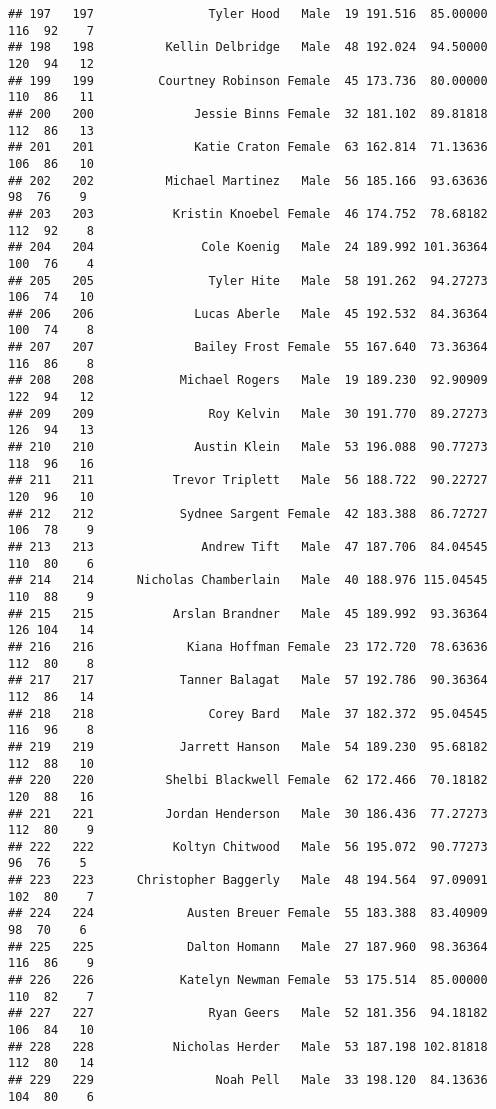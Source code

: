 \documentclass[
]{article}
\begin{document}
\begin{verbatim}
## 197   197                Tyler Hood   Male  19 191.516  85.00000 116  92    7
## 198   198          Kellin Delbridge   Male  48 192.024  94.50000 120  94   12
## 199   199         Courtney Robinson Female  45 173.736  80.00000 110  86   11
## 200   200              Jessie Binns Female  32 181.102  89.81818 112  86   13
## 201   201              Katie Craton Female  63 162.814  71.13636 106  86   10
## 202   202          Michael Martinez   Male  56 185.166  93.63636  98  76    9
## 203   203           Kristin Knoebel Female  46 174.752  78.68182 112  92    8
## 204   204               Cole Koenig   Male  24 189.992 101.36364 100  76    4
## 205   205                Tyler Hite   Male  58 191.262  94.27273 106  74   10
## 206   206              Lucas Aberle   Male  45 192.532  84.36364 100  74    8
## 207   207              Bailey Frost Female  55 167.640  73.36364 116  86    8
## 208   208            Michael Rogers   Male  19 189.230  92.90909 122  94   12
## 209   209                Roy Kelvin   Male  30 191.770  89.27273 126  94   13
## 210   210              Austin Klein   Male  53 196.088  90.77273 118  96   16
## 211   211           Trevor Triplett   Male  56 188.722  90.22727 120  96   10
## 212   212            Sydnee Sargent Female  42 183.388  86.72727 106  78    9
## 213   213               Andrew Tift   Male  47 187.706  84.04545 110  80    6
## 214   214      Nicholas Chamberlain   Male  40 188.976 115.04545 110  88    9
## 215   215           Arslan Brandner   Male  45 189.992  93.36364 126 104   14
## 216   216             Kiana Hoffman Female  23 172.720  78.63636 112  80    8
## 217   217            Tanner Balagat   Male  57 192.786  90.36364 112  86   14
## 218   218                Corey Bard   Male  37 182.372  95.04545 116  96    8
## 219   219            Jarrett Hanson   Male  54 189.230  95.68182 112  88   10
## 220   220          Shelbi Blackwell Female  62 172.466  70.18182 120  88   16
## 221   221          Jordan Henderson   Male  30 186.436  77.27273 112  80    9
## 222   222           Koltyn Chitwood   Male  56 195.072  90.77273  96  76    5
## 223   223      Christopher Baggerly   Male  48 194.564  97.09091 102  80    7
## 224   224             Austen Breuer Female  55 183.388  83.40909  98  70    6
## 225   225             Dalton Homann   Male  27 187.960  98.36364 116  86    9
## 226   226            Katelyn Newman Female  53 175.514  85.00000 110  82    7
## 227   227                Ryan Geers   Male  52 181.356  94.18182 106  84   10
## 228   228           Nicholas Herder   Male  53 187.198 102.81818 112  80   14
## 229   229                 Noah Pell   Male  33 198.120  84.13636 104  80    6

\end{verbatim}
\end{document}

